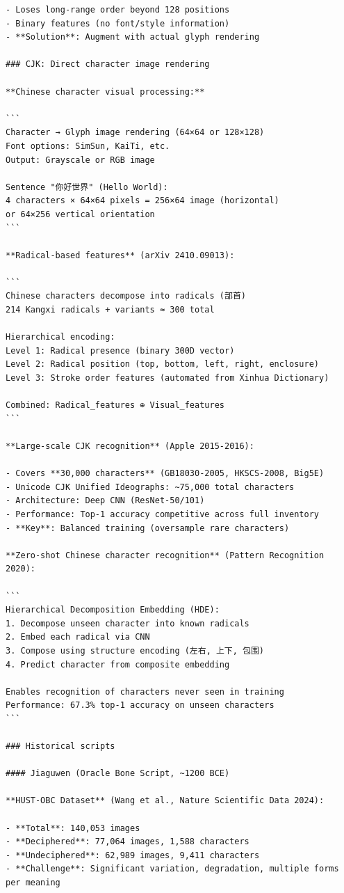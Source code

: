 \documentclass[11pt]{article}
\begin{document}
\begin{verbatim}
- Loses long-range order beyond 128 positions
- Binary features (no font/style information)
- **Solution**: Augment with actual glyph rendering

### CJK: Direct character image rendering

**Chinese character visual processing:**

```
Character → Glyph image rendering (64×64 or 128×128)
Font options: SimSun, KaiTi, etc.
Output: Grayscale or RGB image

Sentence "你好世界" (Hello World):
4 characters × 64×64 pixels = 256×64 image (horizontal)
or 64×256 vertical orientation
```

**Radical-based features** (arXiv 2410.09013):

```
Chinese characters decompose into radicals (部首)
214 Kangxi radicals + variants ≈ 300 total

Hierarchical encoding:
Level 1: Radical presence (binary 300D vector)
Level 2: Radical position (top, bottom, left, right, enclosure)
Level 3: Stroke order features (automated from Xinhua Dictionary)

Combined: Radical_features ⊕ Visual_features
```

**Large-scale CJK recognition** (Apple 2015-2016):

- Covers **30,000 characters** (GB18030-2005, HKSCS-2008, Big5E)
- Unicode CJK Unified Ideographs: ~75,000 total characters
- Architecture: Deep CNN (ResNet-50/101)
- Performance: Top-1 accuracy competitive across full inventory
- **Key**: Balanced training (oversample rare characters)

**Zero-shot Chinese character recognition** (Pattern Recognition 2020):

```
Hierarchical Decomposition Embedding (HDE):
1. Decompose unseen character into known radicals
2. Embed each radical via CNN
3. Compose using structure encoding (左右, 上下, 包围)
4. Predict character from composite embedding

Enables recognition of characters never seen in training
Performance: 67.3% top-1 accuracy on unseen characters
```

### Historical scripts

#### Jiaguwen (Oracle Bone Script, ~1200 BCE)

**HUST-OBC Dataset** (Wang et al., Nature Scientific Data 2024):

- **Total**: 140,053 images
- **Deciphered**: 77,064 images, 1,588 characters
- **Undeciphered**: 62,989 images, 9,411 characters
- **Challenge**: Significant variation, degradation, multiple forms per meaning


\end{verbatim}
\end{document}
